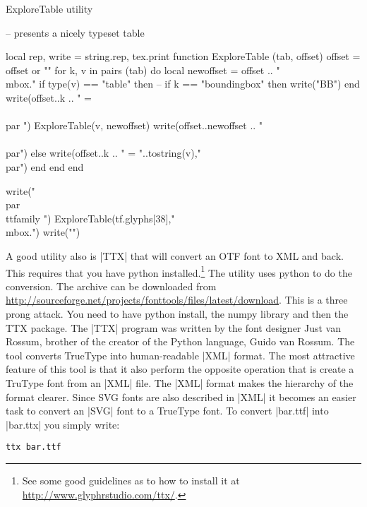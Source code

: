 \begin{texexample}{ExploreTable utility}{}
\begin{luacode*}
-- presents a nicely typeset table 

local rep, write = string.rep, tex.print
function ExploreTable (tab, offset)
    offset = offset or ""
    for k, v in pairs (tab) do
        local newoffset = offset .. "\\mbox{.}"
        if type(v) == "table" then
           -- if k == "boundingbox" then write("BB") end
           write(offset..k .. " = \\{\\par ")
           ExploreTable(v, newoffset)
           write(offset..newoffset .. "\\}\\par")
         else
           write(offset..k .. " = "..tostring(v),"\\par")
         end
      end
end

write("\\par{\\ttfamily ")
ExploreTable(tf.glyphs[38],"\\mbox{.}")
write("}")
  \end{luacode*}
\end{texexample}

A good utility also is |TTX| that will convert an OTF font to XML and back. This requires that you have python installed.\footnote{See some good guidelines as to how to install it at \url{http://www.glyphrstudio.com/ttx/}.} The utility uses python to do the conversion. The archive can be downloaded from \url{http://sourceforge.net/projects/fonttools/files/latest/download}. This is a three prong attack. You need to have python install, the numpy library and then the TTX package. The |TTX| program was written by the font designer Just van Rossum, brother of the creator of the Python language, Guido van Rossum. The tool converts TrueType into human-readable |XML| format. The most attractive feature of this tool is that it also perform the opposite operation that is create a TruType font from an |XML| file. The |XML| format makes the hierarchy of the format clearer. Since SVG fonts are also described in |XML| it becomes an easier task to convert an |SVG| font to a TrueType font. To convert |bar.ttf| into |bar.ttx| you simply write:

\begin{verbatim}
ttx bar.ttf
\end{verbatim}

